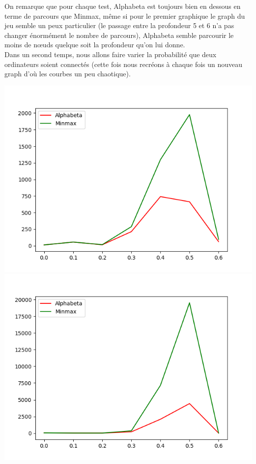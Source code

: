 \documentclass[a4paper,12pt]{article} %
\begin{document}
On remarque que pour chaque test, Alphabeta est toujours bien en dessous en terme de parcours que Minmax, même si pour le premier graphique le graph du jeu semble un peux particulier (le passage entre la profondeur 5 et 6 n'a pas changer énormément le nombre de parcours), Alphabeta semble parcourir le moins de nœuds quelque soit la profondeur qu'on lui donne.\\

Dans un second temps, nous allons faire varier la probabilité que deux ordinateurs soient connectés (cette fois nous recréons à chaque fois un nouveau graph d'où les courbes un peu chaotique).

\begin{center}
\includegraphics[scale=0.5]{images/Figure_4.png}
\includegraphics[scale=0.5]{images/Figure_5.png}

\end{center}
\end{document}
